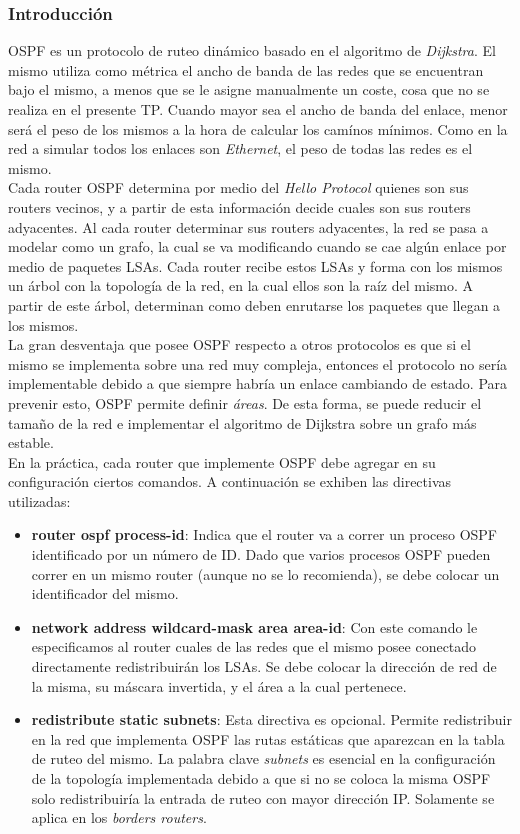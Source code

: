 		\subsubsection{Introducción}
			OSPF es un protocolo de ruteo dinámico basado en el algoritmo de \textit{Dijkstra}. El mismo utiliza como métrica el ancho de banda
			de las redes que se encuentran bajo el mismo, a menos que se le asigne manualmente un coste, cosa que no se realiza en el presente TP. 
			Cuando mayor sea el ancho de banda del enlace, menor será el peso de los mismos a la hora de calcular los camínos mínimos. Como en la red a 
			simular todos los enlaces son \textit{Ethernet}, el peso de todas las redes es el mismo. \\
			\indent Cada router OSPF determina por medio del \textit{Hello Protocol} quienes son sus routers vecinos, y a partir de esta información
			decide cuales son sus routers adyacentes. Al cada router determinar sus routers adyacentes, la red se pasa a modelar como un grafo, la cual
			se va modificando cuando se cae algún enlace por medio de paquetes LSAs. Cada router recibe estos LSAs y forma con los mismos un árbol con		
			la topología de la red, en la cual ellos son la raíz del mismo. A partir de este árbol, determinan como deben enrutarse los paquetes que llegan
			a los mismos. \\
			\indent La gran desventaja que posee OSPF respecto a otros protocolos es que si el mismo se implementa sobre una red muy compleja, entonces
			el protocolo no sería implementable debido a que siempre habría un enlace cambiando de estado. Para prevenir esto, OSPF permite definir 
			\textit{áreas}. De esta forma, se puede reducir el tamaño de la red e implementar el algoritmo de Dijkstra sobre un grafo más estable. \\
			\indent En la práctica, cada router que implemente OSPF debe agregar en su configuración ciertos comandos. A continuación se exhiben las
			directivas utilizadas:

			\begin{itemize}
				\item \textbf{router ospf process-id}: Indica que el router va a correr un proceso OSPF identificado por un número de ID. Dado que varios
				procesos OSPF pueden correr en un mismo router (aunque no se lo recomienda), se debe colocar un identificador del mismo.
				\item \textbf{network address wildcard-mask area area-id}: Con este comando le especificamos al router cuales de las redes que el mismo posee
				conectado directamente redistribuirán los LSAs. Se debe colocar la dirección de red de la misma, su máscara invertida, y el área a la cual 
				pertenece. 
				\item \textbf{redistribute static subnets}: Esta directiva es opcional. Permite redistribuir en la red que implementa OSPF las rutas estáticas
				que aparezcan en la tabla de ruteo del mismo. La palabra clave \textit{subnets} es esencial en la configuración de la topología implementada debido
				a que si no se coloca la misma OSPF solo redistribuiría la entrada de ruteo con mayor dirección IP. Solamente se aplica en los \textit{borders routers}.
			\end{itemize}

